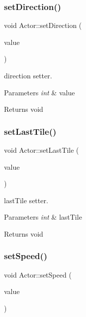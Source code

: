 \subsubsection{\texorpdfstring{set\+Direction()}{setDirection()}}
{\footnotesize\ttfamily void Actor\+::set\+Direction (\begin{DoxyParamCaption}\item[{int}]{value }\end{DoxyParamCaption})}



direction setter. 


\begin{DoxyParams}{Parameters}
{\em int} & value \\
\hline
\end{DoxyParams}
\begin{DoxyReturn}{Returns}
void 
\end{DoxyReturn}
\mbox{\label{class_actor_a4d708f5e042cd6558947820f33520d61}} 
\subsubsection{\texorpdfstring{set\+Last\+Tile()}{setLastTile()}}
{\footnotesize\ttfamily void Actor\+::set\+Last\+Tile (\begin{DoxyParamCaption}\item[{int}]{value }\end{DoxyParamCaption})}



last\+Tile setter. 


\begin{DoxyParams}{Parameters}
{\em int} & last\+Tile \\
\hline
\end{DoxyParams}
\begin{DoxyReturn}{Returns}
void 
\end{DoxyReturn}
\mbox{\label{class_actor_aa678f8ed8724d19bd309e88b1e130840}} 
\subsubsection{\texorpdfstring{set\+Speed()}{setSpeed()}}
{\footnotesize\ttfamily void Actor\+::set\+Speed (\begin{DoxyParamCaption}\item[{int}]{value }\end{DoxyParamCaption})}



